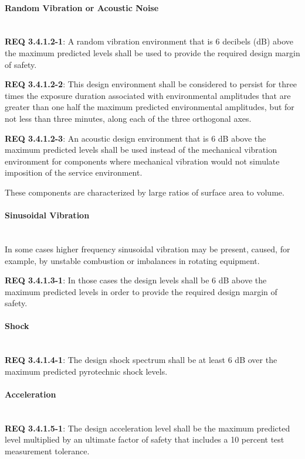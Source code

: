 \documentclass[12pt]{article}
\begin{document}
\paragraph{Random Vibration or Acoustic Noise} \mbox{} \\ %
\noindent \textbf{REQ 3.4.1.2-1}: A random vibration environment that is 6 decibels (dB) above the maximum predicted levels shall be used to provide the required design margin of safety.
 
\noindent \textbf{REQ 3.4.1.2-2}: This design environment shall be considered to persist for three times the exposure duration associated with environmental amplitudes that are greater than one half the maximum predicted environmental amplitudes, but for not less than three minutes, along each of the three orthogonal axes. 

\noindent \textbf{REQ 3.4.1.2-3}: An acoustic design environment that is 6 dB above the maximum predicted levels shall be used instead of the mechanical vibration environment for components where mechanical vibration would not simulate imposition of the service environment. 

These components are characterized by large ratios of surface area to volume.


\paragraph{Sinusoidal Vibration} \mbox{} \\ %
In some cases higher frequency sinusoidal vibration may be present, caused, for example, by unstable combustion or imbalances in rotating equipment. 

\noindent \textbf{REQ 3.4.1.3-1}: In those cases the design levels shall be 6 dB above the maximum predicted levels in order to provide the required design margin of safety.


\paragraph{Shock} \mbox{} \\ %
\noindent \textbf{REQ 3.4.1.4-1}: The design shock spectrum shall be at least 6 dB over the maximum predicted pyrotechnic shock levels.


\paragraph{Acceleration} \mbox{} \\ %
\noindent \textbf{REQ 3.4.1.5-1}: The design acceleration level shall be the maximum predicted level multiplied by an ultimate factor of safety that includes a 10 percent test measurement tolerance. 
\end{document}
